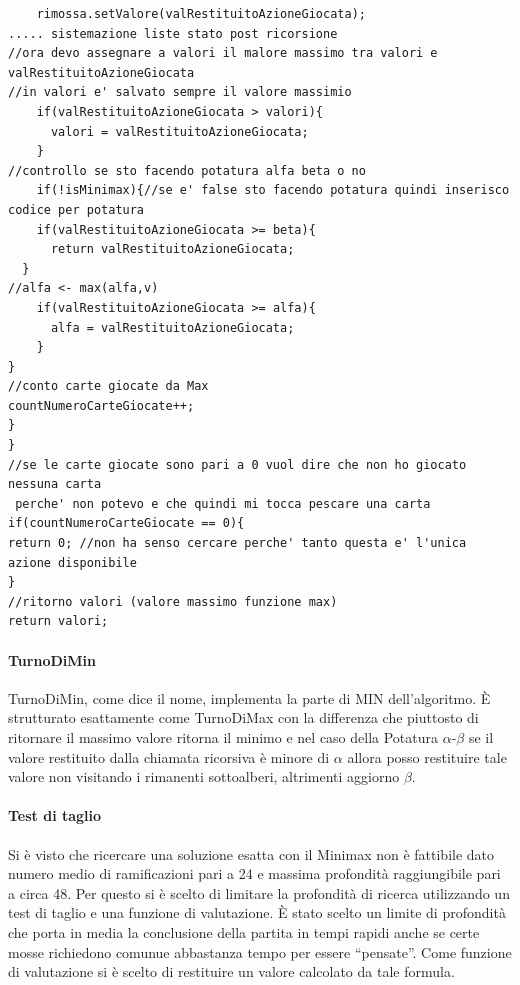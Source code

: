 \begin{lstlisting}
    rimossa.setValore(valRestituitoAzioneGiocata);
..... sistemazione liste stato post ricorsione
//ora devo assegnare a valori il malore massimo tra valori e valRestituitoAzioneGiocata
//in valori e' salvato sempre il valore massimio
    if(valRestituitoAzioneGiocata > valori){
      valori = valRestituitoAzioneGiocata;
    }
//controllo se sto facendo potatura alfa beta o no
    if(!isMinimax){//se e' false sto facendo potatura quindi inserisco codice per potatura
    if(valRestituitoAzioneGiocata >= beta){
      return valRestituitoAzioneGiocata;
  }
//alfa <- max(alfa,v)
    if(valRestituitoAzioneGiocata >= alfa){
      alfa = valRestituitoAzioneGiocata;
    }
}
//conto carte giocate da Max
countNumeroCarteGiocate++;
}
}
//se le carte giocate sono pari a 0 vuol dire che non ho giocato nessuna carta
 perche' non potevo e che quindi mi tocca pescare una carta
if(countNumeroCarteGiocate == 0){
return 0; //non ha senso cercare perche' tanto questa e' l'unica azione disponibile
}
//ritorno valori (valore massimo funzione max)
return valori;	
\end{lstlisting}
	
		\paragraph{TurnoDiMin}
		TurnoDiMin, come dice il nome, implementa la parte di MIN dell'algoritmo. È strutturato esattamente come TurnoDiMax con la differenza che piuttosto di ritornare il massimo valore ritorna il minimo e nel caso della Potatura $\alpha$-$\beta$ se il valore restituito dalla chiamata ricorsiva è minore di $\alpha$ allora posso restituire tale valore non visitando i rimanenti sottoalberi, altrimenti aggiorno $\beta$.
		
		\paragraph{Test di taglio}
		Si è visto che ricercare una soluzione esatta con il Minimax non è fattibile dato numero medio di ramificazioni pari a 24 e massima profondità raggiungibile pari a circa 48. Per questo si è scelto di limitare la profondità di ricerca utilizzando un test di taglio e una funzione di valutazione. È stato scelto un limite di profondità che porta in media la conclusione della partita in tempi rapidi anche se certe mosse richiedono comunue abbastanza tempo per essere ``pensate''. Come funzione di valutazione si è scelto di restituire un valore calcolato da tale formula.\\\\
		
